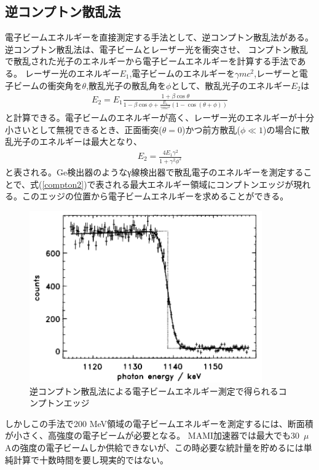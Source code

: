 \documentclass[a4paper,11pt,uplatex]{jsbook}
\begin{document}
\subsection{逆コンプトン散乱法}
電子ビームエネルギーを直接測定する手法として、逆コンプトン散乱法がある。逆コンプトン散乱法は、電子ビームとレーザー光を衝突させ、
コンプトン散乱で散乱された光子のエネルギーから電子ビームエネルギーを計算する手法である。
レーザー光のエネルギー$E_1$,電子ビームのエネルギーを$\gamma mc^2$,レーザーと電子ビームの衝突角を$\theta$,散乱光子の散乱角を$\phi$として、散乱光子のエネルギー$E_2$は
\begin{eqnarray}
  E_2 = E_1\frac{1+\beta\cos{\theta}}{1-\beta\cos{\phi} + \frac{E_1}{\gamma mc^2} (1-\cos{(\theta +\phi)})} \label{compton}
\end{eqnarray}
と計算できる。電子ビームのエネルギーが高く、レーザー光のエネルギーが十分小さいとして無視できるとき、正面衝突($\theta = 0$)かつ前方散乱($\phi \ll 1$)の場合に散乱光子のエネルギーは最大となり、
\begin{eqnarray}
  E_2 = \frac{4E_1\gamma^2}{1 + \gamma^2\phi^2} \label{compton2}
\end{eqnarray}
と表される。Ge検出器のようなγ線検出器で散乱電子のエネルギーを測定することで、式(\ref{compton2})で表される最大エネルギー領域にコンプトンエッジが現れる。このエッジの位置から電子ビームエネルギーを求めることができる。
\begin{figure}[h]
  \centering
  \includegraphics[width=10cm]{image/1-CBS.png}
  \caption[逆コンプトン散乱法]{逆コンプトン散乱法による電子ビームエネルギー測定で得られるコンプトンエッジ\cite{klein1997}}
\end{figure}

しかしこの手法で200 MeV領域の電子ビームエネルギーを測定するには、断面積が小さく、高強度の電子ビームが必要となる。%
MAMI加速器では最大でも30~$\mu$Aの強度の電子ビームしか供給できないが、この時必要な統計量を貯めるには単純計算で十数時間を要し現実的ではない。
\end{document}
